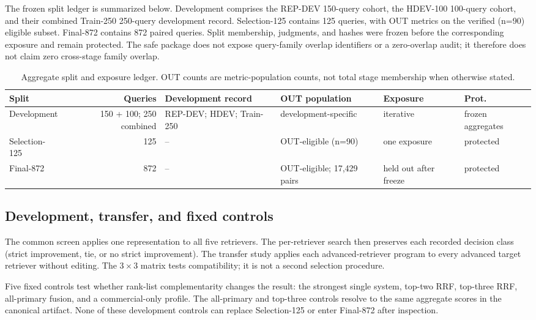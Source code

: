 \documentclass[final,5p,times,twocolumn]{elsarticle}
\newenvironment{widejournal}{\begin{table}[!t]}{\end{table}}
\newcommand{\journalTableFont}{\footnotesize}
\newenvironment{widejournal}{\begin{table}[!htbp]}{\end{table}}
\newcommand{\journalTableFont}{\footnotesize}
\begin{document}
The frozen split ledger is summarized below. Development comprises the
REP-DEV 150-query cohort, the HDEV-100 100-query cohort, and their combined
Train-250 250-query development record. Selection-125 contains 125 queries,
with OUT metrics on the verified (n=90) eligible subset. Final-872 contains
872 paired queries. Split membership, judgments, and hashes were frozen before
the corresponding exposure and remain protected. The safe package does not
expose query-family overlap identifiers or a zero-overlap audit; it therefore
does not claim zero cross-stage family overlap.

\begin{widejournal}
\caption{Aggregate split and exposure ledger. OUT counts are metric-population
counts, not total stage membership when otherwise stated.}
\label{tab:split-ledger}
\centering
\journalTableFont
\scriptsize
\setlength{\tabcolsep}{2pt}
\sloppy
\begin{tabularx}{\textwidth}{@{}P{1.7cm}r P{1.8cm}P{2.1cm}P{1.7cm}Y@{}}
\toprule
Split & Queries & Development record & OUT population & Exposure & Prot. \\
\midrule
Development & 150 + 100; 250 combined & REP-DEV; HDEV; Train-250 & development-specific & iterative & frozen aggregates \\
Selection-125 & 125 & -- & OUT-eligible (n=90) & one exposure & protected \\
Final-872 & 872 & -- & OUT-eligible; 17,429 pairs & held out after freeze & protected \\
\bottomrule
\end{tabularx}
\end{widejournal}

\subsection{Development, transfer, and fixed controls}

The common screen applies one representation to all five retrievers. The
per-retriever search then preserves each recorded decision class (strict
improvement, tie, or no strict improvement). The transfer study applies each
advanced-retriever program to every advanced target retriever without editing.
The \(3\times3\) matrix tests compatibility; it is not a second selection
procedure.

Five fixed controls test whether rank-list complementarity changes the result:
the strongest single system, top-two RRF, top-three RRF, all-primary fusion,
and a commercial-only profile. The all-primary and top-three controls resolve
to the same aggregate scores in the canonical artifact. None of these
development controls can replace Selection-125 or enter Final-872 after
inspection.
\end{document}
